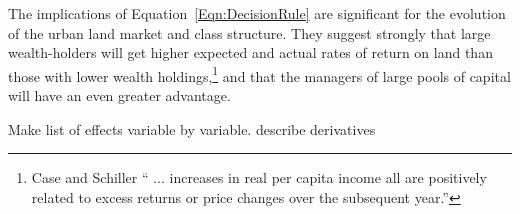The implications of Equation~\ref{Eqn:DecisionRule} are significant for the evolution of the urban land market and class structure. They suggest strongly that large wealth-holders will get higher expected and actual rates of return on land than those with  lower wealth holdings,\footnote{Case and Schiller ``%
 ... increases in real per capita income all are positively related to excess returns or price changes over the subsequent year.''} and that the managers of large pools of capital will have an even greater advantage. 
 
 Make list of effects variable by variable. describe derivatives
 
